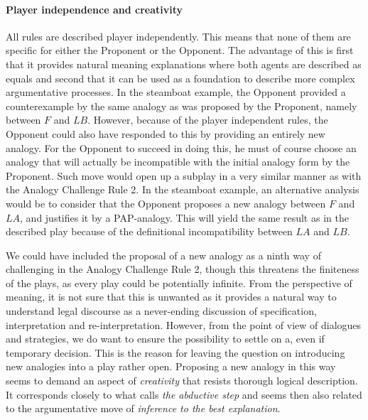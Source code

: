 				\paragraph{Player independence and creativity}

				All rules are described player independently. This means that none of them are specific for either the Proponent or the Opponent. The advantage of this is first that it provides natural meaning explanations where both agents are described as equals and second that it can be used as a foundation to describe more complex argumentative processes. In the steamboat example, the Opponent provided a counterexample by the same analogy as was proposed by the Proponent, namely between $F$ and $LB$. However, because of the player independent rules, the Opponent could also have responded to this by providing an entirely new analogy. For the Opponent to succeed in doing this, he must of course choose an analogy that will actually be incompatible with the initial analogy form by the Proponent. Such move would open up a subplay in a very similar manner as with the Analogy Challenge Rule 2. In the steamboat example, an alternative analysis would be to consider that the Opponent proposes a new analogy between $F$ and $LA$, and justifies it by a PAP-analogy. This will yield the same result as in the described play because of the definitional incompatibility between $LA$ and $LB$. 
				
				We could have included the proposal of a new analogy as a ninth way of challenging in the Analogy Challenge Rule 2, though this threatens the finiteness of the plays, as every play could be potentially infinite. From the perspective of meaning, it is not sure that this is unwanted as it provides a natural way to understand legal discourse as a never-ending discussion of specification, interpretation and re-interpretation. However, from the point of view of dialogues and strategies, we do want to ensure the possibility to settle on a, even if temporary decision. This is the reason for leaving the question on introducing new analogies into a play rather open. Proposing a new analogy in this way seems to demand an aspect of \textit{creativity} that resists thorough logical description. It corresponds closely to what \textcite{Brewer1996} calls \textit{the abductive step} and seems then also related to the argumentative move of \textit{inference to the best explanation}. 
				
